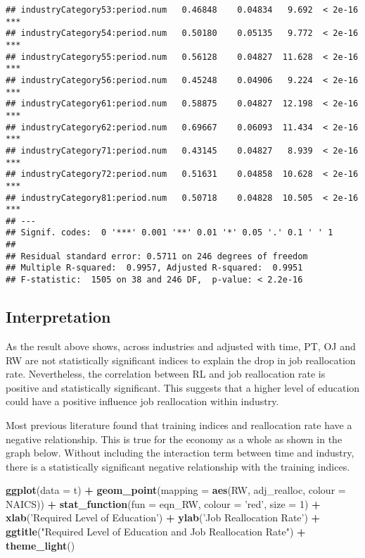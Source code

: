 \documentclass[
]{article}
\newenvironment{Shaded}{\begin{snugshade}}{\end{snugshade}}
\newcommand{\DataTypeTok}[1]{\textcolor[rgb]{0.13,0.29,0.53}{#1}}
\newcommand{\DecValTok}[1]{\textcolor[rgb]{0.00,0.00,0.81}{#1}}
\newcommand{\KeywordTok}[1]{\textcolor[rgb]{0.13,0.29,0.53}{\textbf{#1}}}
\newcommand{\NormalTok}[1]{#1}
\newcommand{\OperatorTok}[1]{\textcolor[rgb]{0.81,0.36,0.00}{\textbf{#1}}}
\newcommand{\StringTok}[1]{\textcolor[rgb]{0.31,0.60,0.02}{#1}}
\begin{document}
\begin{verbatim}
## industryCategory53:period.num   0.46848    0.04834   9.692  < 2e-16 ***
## industryCategory54:period.num   0.50180    0.05135   9.772  < 2e-16 ***
## industryCategory55:period.num   0.56128    0.04827  11.628  < 2e-16 ***
## industryCategory56:period.num   0.45248    0.04906   9.224  < 2e-16 ***
## industryCategory61:period.num   0.58875    0.04827  12.198  < 2e-16 ***
## industryCategory62:period.num   0.69667    0.06093  11.434  < 2e-16 ***
## industryCategory71:period.num   0.43145    0.04827   8.939  < 2e-16 ***
## industryCategory72:period.num   0.51631    0.04858  10.628  < 2e-16 ***
## industryCategory81:period.num   0.50718    0.04828  10.505  < 2e-16 ***
## ---
## Signif. codes:  0 '***' 0.001 '**' 0.01 '*' 0.05 '.' 0.1 ' ' 1
## 
## Residual standard error: 0.5711 on 246 degrees of freedom
## Multiple R-squared:  0.9957, Adjusted R-squared:  0.9951 
## F-statistic:  1505 on 38 and 246 DF,  p-value: < 2.2e-16
\end{verbatim}

\hypertarget{interpretation}{%
\subsection{Interpretation}\label{interpretation}}

As the result above shows, across industries and adjusted with time, PT,
OJ and RW are not statistically significant indices to explain the drop
in job reallocation rate. Nevertheless, the correlation between RL and
job reallocation rate is positive and statistically significant. This
suggests that a higher level of education could have a positive
influence job reallocation within industry.

Most previous literature found that training indices and reallocation
rate have a negative relationship. This is true for the economy as a
whole as shown in the graph below. Without including the interaction
term between time and industry, there is a statistically significant
negative relationship with the training indices.

\begin{Shaded}
\begin{Highlighting}[]
\KeywordTok{ggplot}\NormalTok{(}\DataTypeTok{data =}\NormalTok{ t) }\OperatorTok{+}
\StringTok{  }\KeywordTok{geom_point}\NormalTok{(}\DataTypeTok{mapping =} \KeywordTok{aes}\NormalTok{(RW, adj_realloc, }\DataTypeTok{colour =}\NormalTok{ NAICS)) }\OperatorTok{+}
\StringTok{  }\KeywordTok{stat_function}\NormalTok{(}\DataTypeTok{fun =}\NormalTok{ eqn_RW, }\DataTypeTok{colour =} \StringTok{'red'}\NormalTok{, }\DataTypeTok{size =} \DecValTok{1}\NormalTok{) }\OperatorTok{+}
\StringTok{  }\KeywordTok{xlab}\NormalTok{(}\StringTok{'Required Level of Education'}\NormalTok{) }\OperatorTok{+}\StringTok{ }
\StringTok{  }\KeywordTok{ylab}\NormalTok{(}\StringTok{'Job Reallocation Rate'}\NormalTok{) }\OperatorTok{+}\StringTok{ }
\StringTok{  }\KeywordTok{ggtitle}\NormalTok{(}\StringTok{"Required Level of Education and Job Reallocation Rate"}\NormalTok{) }\OperatorTok{+}
\StringTok{  }\KeywordTok{theme_light}\NormalTok{()}
\end{Highlighting}
\end{Shaded}
\end{document}
